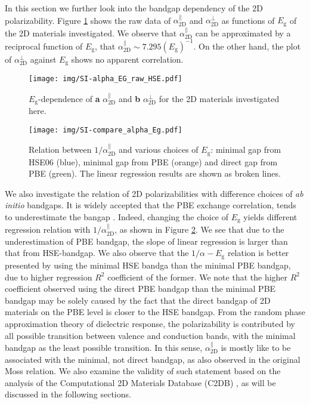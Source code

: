 \documentclass[manuscript=suppinfo,email=true,hyperref=true,keywords=false]{achemso}
\begin{document}
In this section we further look into the bandgap dependency of the 2D
polarizability. Figure \ref{fig:SI-raw-HSE} shows the raw data of
$\alpha_{\mathrm{2D}}^{\parallel}$ and $\alpha_{\mathrm{2D}}^{\perp}$
as functions of $E_{\mathrm{g}}$ of the 2D materials investigated. We
observe that $\alpha_{\mathrm{2D}}^{\parallel}$ can be approximated by
a reciprocal function of $E_{\mathrm{g}}$, that
$\alpha_{\mathrm{2D}}^{\parallel}\sim{}
7.295(E_{\mathrm{g}})^{-1}$. On the other hand, the plot of
$\alpha_{\mathrm{2D}}^{\perp}$ against $E_{\mathrm{g}}$ shows no
apparent correlation.
\begin{figure}[htbp]
  \centering
  \texttt{[image: img/SI-alpha\_EG\_raw\_HSE.pdf]}
  \caption{$E_{\mathrm{g}}$-dependence of \textbf{a} $\alpha_{\mathrm{2D}}^{\parallel}$ and
    \textbf{b} $\alpha_{\mathrm{2D}}^{\perp}$ for the 2D materials investigated here.}
  \label{fig:SI-raw-HSE}
\end{figure}

\begin{figure}[htbp]
  \centering
  \texttt{[image: img/SI-compare\_alpha\_Eg.pdf]}
  \caption{Relation between $1/\alpha_{\mathrm{2D}}^{\parallel}$ and various choices
    of $E_{\mathrm{g}}$: minimal gap from HSE06 (blue), minimal gap
    from PBE (orange) and direct gap from PBE (green). The linear
    regression results are shown as broken lines.}
  \label{fig:alpha-Eg-diff}
\end{figure}

We also investigate the relation of 2D polarizabilities with
difference choices of \textit{ab initio} bandgaps. It is widely
accepted that the PBE exchange correlation, tends to underestimate the
bangap \cite{Heyd_2005,Kumar_2016_PRB,Kumar_2016_jpcc}.  Indeed,
changing the choice of $E_{\mathrm{g}}$ yields different regression
relation with $1/\alpha_{\mathrm{2D}}^{\parallel}$, as shown in Figure
\ref{fig:alpha-Eg-diff}. We see that due to the underestimation of PBE
bandgap, the slope of linear regression is larger than that from
HSE-bandgap. We also observe that the $1/\alpha-E_{\mathrm{g}}$
relation is better presented by using the minimal HSE bandga than the
minimal PBE bandgap, due to higher regression $R^{2}$ coefficient of
the former. We note that the higher $R^{2}$ coefficient observed using
the direct PBE bandgap than the minimal PBE bandgap may be solely
caused by the fact that the direct bandgap of 2D materials on the PBE
level is closer to the HSE bandgap. From the random phase
approximation theory of dielectric response, the polarizability is
contributed by all possible transition between valence and conduction
bands, with the minimal bandgap as the least possible transition. In
this sense, $\alpha_{\mathrm{2D}}^{\parallel}$ is mostly like to be associated with
the minimal, not direct bandgap, as also observed in the original Moss
relation. We also examine the validity of such statement based on the
analysis of the Computational 2D Materials Database (C2DB)
\cite{Haastrup_2018}, as will be discussed in the following sections.
\end{document}
